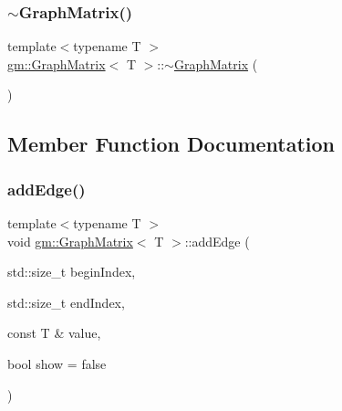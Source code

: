 \mbox{\label{classgm_1_1_graph_matrix_a3b0993020ce3351d0ec4b7fe2adc2580}} 
\subsubsection{\texorpdfstring{$\sim$\+Graph\+Matrix()}{~GraphMatrix()}}
{\footnotesize\ttfamily template$<$typename T $>$ \\
\mbox{\hyperlink{classgm_1_1_graph_matrix}{gm\+::\+Graph\+Matrix}}$<$ T $>$\+::$\sim$\mbox{\hyperlink{classgm_1_1_graph_matrix}{Graph\+Matrix}} (\begin{DoxyParamCaption}{ }\end{DoxyParamCaption})}



\subsection{Member Function Documentation}
\mbox{\label{classgm_1_1_graph_matrix_a0500fe2b6a585690c33ca4ee182cbdea}} 
\subsubsection{\texorpdfstring{add\+Edge()}{addEdge()}}
{\footnotesize\ttfamily template$<$typename T $>$ \\
void \mbox{\hyperlink{classgm_1_1_graph_matrix}{gm\+::\+Graph\+Matrix}}$<$ T $>$\+::add\+Edge (\begin{DoxyParamCaption}\item[{std\+::size\+\_\+t}]{begin\+Index,  }\item[{std\+::size\+\_\+t}]{end\+Index,  }\item[{const T \&}]{value,  }\item[{bool}]{show = {\ttfamily false} }\end{DoxyParamCaption})}

\mbox{\label{classgm_1_1_graph_matrix_a300259b6a1b30f01d5084b48b22a83b8}} 
